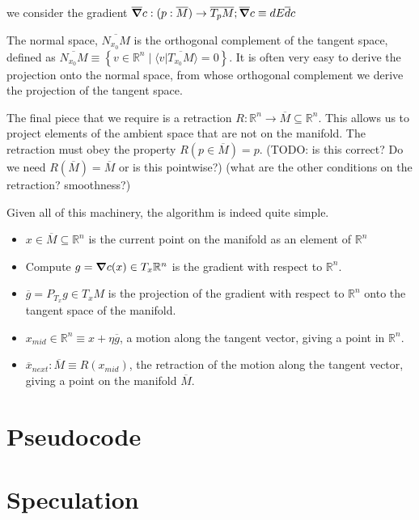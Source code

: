 \documentclass[11pt]{book}
\begin{document}
we consider the gradient
$\overline \grad c : (p: \overline M) \rightarrow \overline{T_p M}; \overline \grad c \equiv dE \overline dc$

The normal space,
$\overline{N_{x_0} M}$ is the orthogonal complement of the tangent space, defined
as $\overline{N_{x_0} M} \equiv \left\{ v \in \mathbb R^n \mid \langle v | \overline{T_{x_0} M} \rangle = 0 \right\}$.
It is often very easy to derive the projection onto the normal space, from
whose orthogonal complement we derive the projection of the tangent space.

The final piece that we require is a retraction $R: \mathbb R^n \rightarrow \overline M \subseteq \mathbb R^n$. This allows
us to project elements of the ambient space that are not on the manifold. The
retraction must obey the property $R(p \in \overline M) = p$.
(TODO: is this correct? Do we need $R(\overline M) = \overline M$ or is this pointwise?)
(what are the other conditions on the retraction? smoothness?)

Given all of this machinery, the algorithm is indeed quite simple. 

\begin{itemize}
	\item $x \in \overline M \subseteq \mathbb R^n$ is the current point on the manifold as an element of $\mathbb R^n$
	\item Compute $g = \grad c(x) \in T_x \mathbb R^n$ is the gradient with respect to $\mathbb R^n$.
	\item $\overline g = P_{T_x} g \in T_x M$ is the projection of the gradient with respect to $\mathbb R^n$ onto the 
	tangent space of the manifold.
	\item $x_{mid}\in \mathbb R^n \equiv x + \eta \overline g$, a motion along the tangent vector, giving a point in
	$\mathbb R^n$.
	\item $\overline x_{next}: \overline M \equiv R(x_{mid})$, the retraction of the motion along the tangent vector,
	giving a point on the manifold $\overline M$.
\end{itemize}

\section{Pseudocode}



\section{Speculation}
\end{document}
